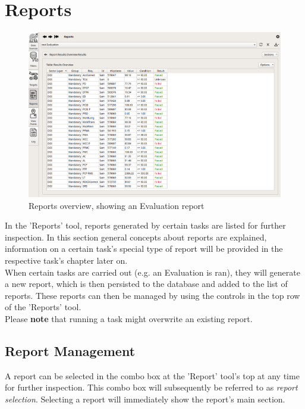 
\section{Reports}
\label{sec:reports}

\begin{figure}[H]
    \hspace*{-2.5cm}
    \includegraphics[width=19cm,frame]{figures/reports.png}
  \caption{Reports overview, showing an Evaluation report}
\end{figure}

In the 'Reports' tool, reports generated by certain tasks are listed for further inspection. 
In this section general concepts about reports are explained, information on a certain task's special type 
of report will be provided in the respective task's chapter later on. \\

When certain tasks are carried out (e.g. an Evaluation is ran), they will generate a new report, which is then persisted 
to the database and added to the list of reports. These reports can then be managed by using the controls in the top row
of the 'Reports' tool. \\

Please \textbf{note} that running a task might overwrite an existing report. \\

\subsection{Report Management}

A report can be selected in the combo box at the 'Report' tool's top at any time for further inspection. 
This combo box will subsequently be referred to as \textit{report selection}. 
Selecting a report will immediately show the report's main section. \\

